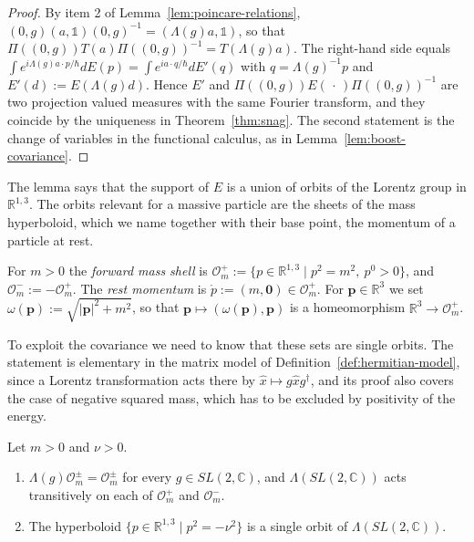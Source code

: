 	\begin{proof}
		By item 2 of Lemma~\ref{lem:poincare-relations}, $(0,g)(a,\mathbb{1})(0,g)^{-1}=(\Lambda(g)a,\mathbb{1})$, so that $\Pi((0,g))T(a)\Pi((0,g))^{-1}=T(\Lambda(g)a)$. The right-hand side equals $\int e^{i\Lambda(g)a\cdot p/\hbar}dE(p)=\int e^{ia\cdot q/\hbar}dE'(q)$ with $q=\Lambda(g)^{-1}p$ and $E'(d):=E(\Lambda(g)d)$. Hence $E'$ and $\Pi((0,g))E(\,\cdot\,)\Pi((0,g))^{-1}$ are two projection valued measures with the same Fourier transform, and they coincide by the uniqueness in Theorem~\ref{thm:snag}. The second statement is the change of variables in the functional calculus, as in Lemma~\ref{lem:boost-covariance}.
	\end{proof}
	
	The lemma says that the support of $E$ is a union of orbits of the Lorentz group in $\mathbb{R}^{1,3}$. The orbits relevant for a massive particle are the sheets of the mass hyperboloid, which we name together with their base point, the momentum of a particle at rest.
	
	\begin{definition}\label{def:mass-shell}
		For $m>0$ the \emph{forward mass shell} is $\mathcal{O}_m^+:=\{p\in\mathbb{R}^{1,3}\mid p^2=m^2,\ p^0>0\}$, and $\mathcal{O}_m^-:=-\mathcal{O}_m^+$. The \emph{rest momentum} is $\mathring{p}:=(m,\mathbf{0})\in\mathcal{O}_m^+$. For $\mathbf{p}\in\mathbb{R}^3$ we set $\omega(\mathbf{p}):=\sqrt{|\mathbf{p}|^2+m^2}$, so that $\mathbf{p}\mapsto(\omega(\mathbf{p}),\mathbf{p})$ is a homeomorphism $\mathbb{R}^3\to\mathcal{O}_m^+$.
	\end{definition}
	
	To exploit the covariance we need to know that these sets are single orbits. The statement is elementary in the matrix model of Definition~\ref{def:hermitian-model}, since a Lorentz transformation acts there by $\hat{x}\mapsto g\hat{x}g^\dagger$, and its proof also covers the case of negative squared mass, which has to be excluded by positivity of the energy.
	
	\begin{lemma}\label{lem:hyperboloid-orbits}
		Let $m>0$ and $\nu>0$.
		\begin{enumerate}
			\item $\Lambda(g)\mathcal{O}_m^{\pm}=\mathcal{O}_m^{\pm}$ for every $g\in SL(2,\mathbb{C})$, and $\Lambda(SL(2,\mathbb{C}))$ acts transitively on each of $\mathcal{O}_m^+$ and $\mathcal{O}_m^-$.
			\item The hyperboloid $\{p\in\mathbb{R}^{1,3}\mid p^2=-\nu^2\}$ is a single orbit of $\Lambda(SL(2,\mathbb{C}))$.
		\end{enumerate}
	\end{lemma}
	
